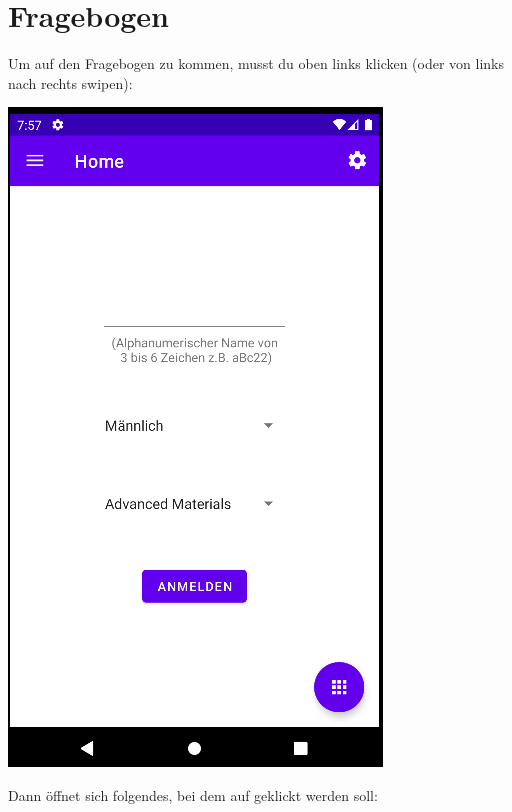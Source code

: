 \documentclass[ngerman]{tutorial}
\begin{document}
\section{Fragebogen}
Um auf den Fragebogen zu kommen, musst du oben links klicken (oder von links nach rechts swipen):
\begin{center}
    \includegraphics[scale=0.45]{start_reg.png}
\end{center}
Dann öffnet sich folgendes, bei dem auf  geklickt werden soll:
\end{document}
